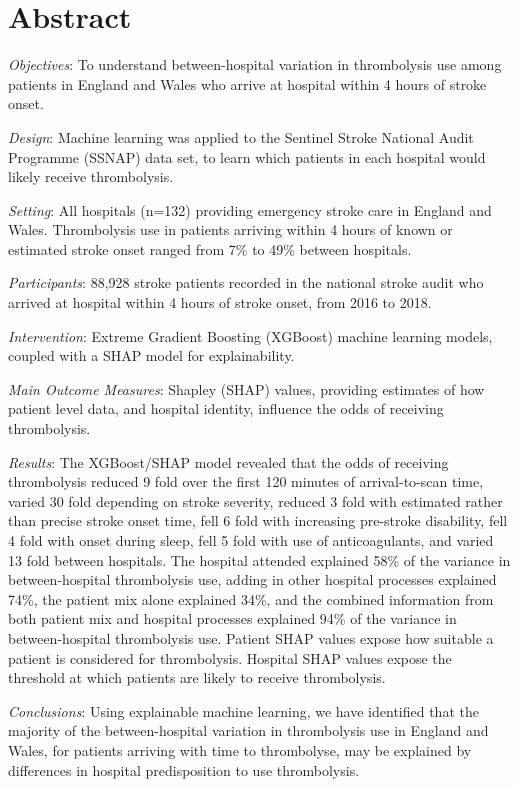\section*{Abstract}

\emph{Objectives}: To understand between-hospital variation in thrombolysis use among patients in England and Wales who arrive at hospital within 4 hours of stroke onset.

\emph{Design}: Machine learning was applied to the Sentinel Stroke National Audit Programme (SSNAP)  data set, to learn which patients in each hospital would likely receive thrombolysis.

\emph{Setting}: All hospitals (n=132) providing emergency stroke care in England and Wales. Thrombolysis use in patients arriving within 4 hours of known or estimated stroke onset ranged from 7\% to 49\% between hospitals.

\emph{Participants}: 88,928 stroke patients recorded in the national stroke audit who arrived at hospital within 4 hours of stroke onset, from 2016 to 2018.

\emph{Intervention}: Extreme Gradient Boosting (XGBoost) machine learning models, coupled with a SHAP model for explainability.

\emph{Main Outcome Measures}: Shapley (SHAP) values, providing estimates of how patient level data, and hospital identity, influence the odds of receiving thrombolysis.

\emph{Results}: The XGBoost/SHAP model revealed that the odds of receiving thrombolysis reduced 9 fold over the first 120 minutes of arrival-to-scan time, varied 30 fold depending on stroke severity, reduced 3 fold with estimated rather than precise stroke onset time, fell 6 fold with increasing pre-stroke disability, fell 4 fold with onset during sleep, fell 5 fold with use of anticoagulants, and varied 13 fold between hospitals. The hospital attended explained 58\% of the variance in between-hospital thrombolysis use, adding in other hospital processes explained 74\%, the patient mix alone explained 34\%, and the combined information from both patient mix and hospital processes explained 94\% of the variance in between-hospital thrombolysis use. %
Patient SHAP values expose how suitable a patient is considered for thrombolysis. Hospital SHAP values expose the threshold at which patients are likely to receive thrombolysis.



\emph{Conclusions}: Using explainable machine learning, we have identified that the majority of the between-hospital variation in thrombolysis use in England and Wales, for patients arriving with time to thrombolyse, may be explained by differences in hospital predisposition to use thrombolysis.